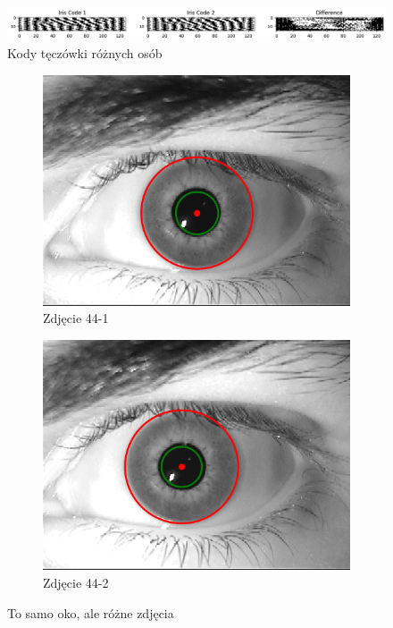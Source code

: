 \documentclass[a4paper]{article}
\begin{document}
\begin{figure}[H]
    \centering
    \includegraphics[width=0.75\linewidth]{figures/rozne osoby.png}
    \caption{Kody tęczówki różnych osób}
    \label{fig:rozne-osoby}
\end{figure}

\begin{figure}[H]
    \centering
    \begin{subfigure}[t]{0.48\linewidth}
        \centering
        \includegraphics[width=0.75\linewidth]{figures/44-1.png}
        \caption{Zdjęcie 44-1}
    \end{subfigure}
    \begin{subfigure}[t]{0.48\linewidth}
        \centering
        \includegraphics[width=0.75\linewidth]{figures/44-2.png}
        \caption{Zdjęcie 44-2}
    \end{subfigure}
    \caption{To samo oko, ale różne zdjęcia}
    \label{fig:to-samo-oko-comparison}
\end{figure}
\end{document}
